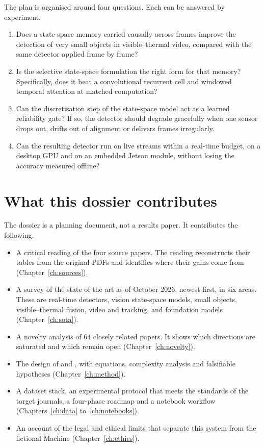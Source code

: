 The plan is organised around four questions. Each can be answered by
experiment.

\begin{enumerate}[label=\textsc{rq}\arabic*., leftmargin=3.2em]
  \item Does a state-space memory carried causally across frames improve the
        detection of very small objects in visible--thermal video, compared
        with the same detector applied frame by frame?
  \item Is the selective state-space formulation the right form for that
        memory? Specifically, does it beat a convolutional recurrent cell
        and windowed temporal attention at matched computation?
  \item Can the discretisation step of the state-space model act as a learned
        reliability gate? If so, the detector should degrade gracefully when
        one sensor drops out, drifts out of alignment or delivers frames
        irregularly.
  \item Can the resulting detector run on live streams within a real-time
        budget, on a desktop GPU and on an embedded Jetson module, without
        losing the accuracy measured offline?
\end{enumerate}

\section{What this dossier contributes}

The dossier is a planning document, not a results paper. It contributes the
following.

\begin{itemize}
  \item A critical reading of the four source papers. The reading
        reconstructs their tables from the original PDFs and identifies
        where their gains come from (Chapter~\ref{ch:sources}).
  \item A survey of the state of the art as of October 2026, newest first,
        in six areas. These are real-time detectors, vision state-space
        models, small objects, visible--thermal fusion, video and tracking,
        and foundation models (Chapter~\ref{ch:sota}).
  \item A novelty analysis of 64 closely related papers. It shows which
        directions are saturated and which remain open
        (Chapter~\ref{ch:novelty}).
  \item The design of \method{} and \methodS{}, with equations, complexity
        analysis and falsifiable hypotheses (Chapter~\ref{ch:method}).
  \item A dataset stack, an experimental protocol that meets the standards
        of the target journals, a four-phase roadmap and a notebook workflow
        (Chapters~\ref{ch:data} to~\ref{ch:notebooks}).
  \item An account of the legal and ethical limits that separate this
        system from the fictional Machine (Chapter~\ref{ch:ethics}).
\end{itemize}


